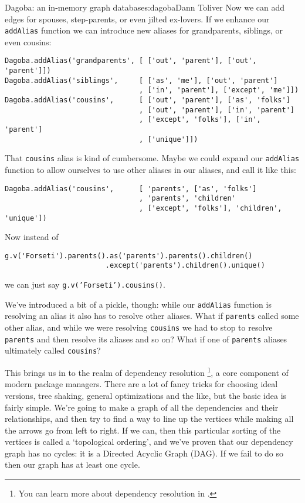 \begin{aosachapter}{Dagoba: an in-memory graph database}{s:dagoba}{Dann Toliver}
Now we can add edges for spouses, step-parents, or even jilted
ex-lovers. If we enhance our \texttt{addAlias} function we can introduce
new aliases for grandparents, siblings, or even cousins:

\begin{verbatim}
Dagoba.addAlias('grandparents', [ ['out', 'parent'], ['out', 'parent']])
Dagoba.addAlias('siblings',     [ ['as', 'me'], ['out', 'parent']
                                , ['in', 'parent'], ['except', 'me']])
Dagoba.addAlias('cousins',      [ ['out', 'parent'], ['as', 'folks']
                                , ['out', 'parent'], ['in', 'parent']
                                , ['except', 'folks'], ['in', 'parent']
                                , ['unique']])
\end{verbatim}

That \texttt{cousins} alias is kind of cumbersome. Maybe we could expand
our \texttt{addAlias} function to allow ourselves to use other aliases
in our aliases, and call it like this:

\begin{verbatim}
Dagoba.addAlias('cousins',      [ 'parents', ['as', 'folks']
                                , 'parents', 'children'
                                , ['except', 'folks'], 'children', 'unique'])
\end{verbatim}

Now instead of

\begin{verbatim}
g.v('Forseti').parents().as('parents').parents().children()
                        .except('parents').children().unique()
\end{verbatim}

we can just say \texttt{g.v('Forseti').cousins()}.

We've introduced a bit of a pickle, though: while our \texttt{addAlias}
function is resolving an alias it also has to resolve other aliases.
What if \texttt{parents} called some other alias, and while we were
resolving \texttt{cousins} we had to stop to resolve \texttt{parents}
and then resolve its aliases and so on? What if one of \texttt{parents}
aliases ultimately called \texttt{cousins}?

This brings us in to the realm of dependency resolution \footnote{You
  can learn more about dependency resolution in
  .}, a core component of modern package
managers. There are a lot of fancy tricks for choosing ideal versions,
tree shaking, general optimizations and the like, but the basic idea is
fairly simple. We're going to make a graph of all the dependencies and
their relationships, and then try to find a way to line up the vertices
while making all the arrows go from left to right. If we can, then this
particular sorting of the vertices is called a `topological ordering',
and we've proven that our dependency graph has no cycles: it is a
Directed Acyclic Graph (DAG). If we fail to do so then our graph has at
least one cycle.


\end{aosachapter}
